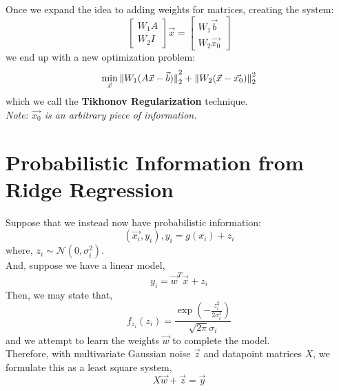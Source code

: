 Once we expand the idea to adding weights for matrices, creating the system:
\[
    \begin{bmatrix} W_1 A \\ W_2 I \end{bmatrix} \vec{x} = \begin{bmatrix} W_1 \vec{b} \\ W_2 \vec{x_0} \end{bmatrix}
\]
we end up with a new optimization problem:
\[
    \min_{\vec{x}} \pnorm[2]{W_1 (A \vec{x} - \vec{b})}{2} + \pnorm[2]{W_2 (\vec{x} - \vec{x_0})}{2}
\]
which we call the \textbf{Tikhonov Regularization} technique. \\
\textit{Note: $\vec{x_0}$ is an arbitrary piece of information.}

\section{Probabilistic Information from Ridge Regression}
Suppose that we instead now have probabilistic information:
\[
    (\vec{x_i}, y_i), y_i = g(x_i) + z_i
\]
where, $z_i \sim \mathcal{N}(0, \sigma_i^2)$. \\
And, suppose we have a linear model,
\[
    y_i = \vec{w}^T \vec{x} + z_i
\]
Then, we may state that,
\[
    f_{z_i} (z_i) = \frac{\exp(-\frac{z_i^2}{2\sigma_i^2})}{\sqrt{2 \pi} \sigma_i}
\]
and we attempt to learn the weights $\vec{w}$ to complete the model. \\
Therefore, with multivariate Gaussian noise $\vec{z}$ and datapoint matrices $X$, we formulate this as a least square system,
\[
    X \vec{w} + \vec{z} = \vec{y}
\]

